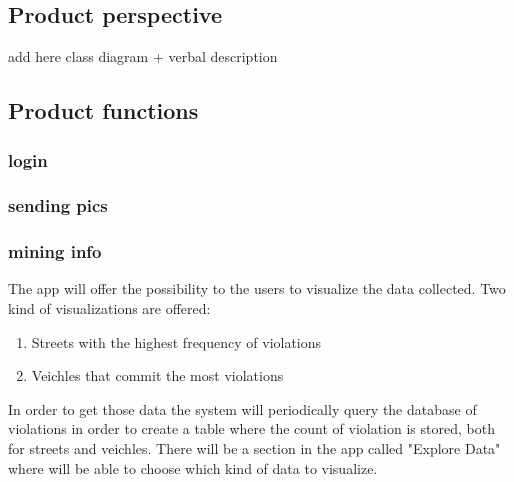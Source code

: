 



\subsection{Product perspective }


add here class diagram + verbal description





\subsection{Product functions}

\subsubsection{login }
\subsubsection{sending pics}
\subsubsection{mining info }
The app will offer the possibility to the users to visualize the data collected.
Two kind of visualizations are offered:
\begin{enumerate}
  \item Streets with the highest frequency of violations
  \item Veichles that commit the most violations
\end{enumerate}
In order to get those data the system will periodically query the database of violations in order to create a table where the count of violation is stored, both for streets and veichles.
There will be a section in the app called "Explore Data" where will be able to choose which kind of data to visualize.


